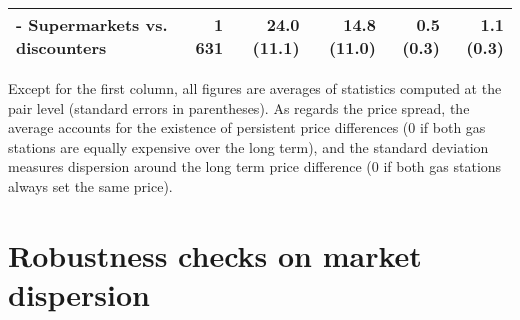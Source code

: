 \documentclass[english]{article}
\begin{document}
\begin{table}[H]
\begin{threeparttable}
\begin{tabular}{lrrrrr}
    \hspace*{4mm} - Supermarkets vs. discounters & 1 631 & 24.0 (11.1) & 14.8 (11.0) & 0.5 (0.3) & 1.1 (0.3) \\
    \bottomrule
    \bottomrule
\end{tabular}
\begin{tablenotes}
			\small
      \item Except for the first column, all figures are averages of statistics computed at the pair level (standard errors in parentheses). As regards the price spread, the average accounts for the existence of persistent price differences (0 if both gas stations are equally expensive over the long term), and the standard deviation measures dispersion around the long term price difference (0 if both gas stations always set the same price).
\end{tablenotes}
\end{threeparttable}
\end{table}

\section{Robustness checks on market dispersion}
\end{document}
